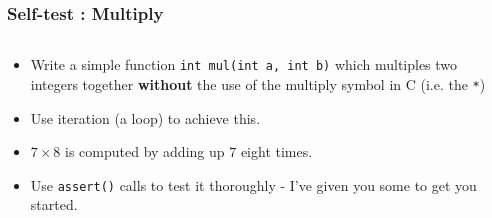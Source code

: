 
\begin{frame}[fragile]
\frametitle{Self-test : Multiply}
\begin{columns}

\begin{column}{0.5\textwidth}
\begin{itemize}[<+->]
\item Write a simple function \verb^int mul(int a, int b)^ which
multiples two integers together {\bf without} the use of the
multiply symbol in C (i.e. the \verb^*^)
\item Use iteration (a loop) to achieve this.
\item $7\times8$ is computed by adding up $7$ eight times.
\item Use \verb^assert()^ calls to test it thoroughly - I've given you some to get you started.
\end{itemize}
\end{column}

\begin{column}{0.40\textwidth}

\end{column}

\end{columns}
\end{frame}


